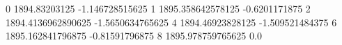 0 1894.83203125 -1.146728515625
1 1895.358642578125 -0.6201171875
2 1894.4136962890625 -1.5650634765625
4 1894.46923828125 -1.509521484375
6 1895.162841796875 -0.81591796875
8 1895.978759765625 0.0
